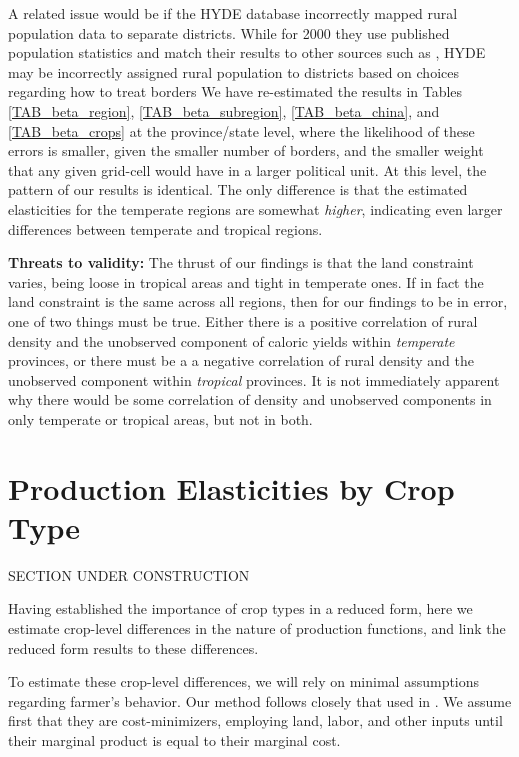 \documentclass[11pt]{article}
\begin{document}
A related issue would be if the HYDE database incorrectly mapped rural population data to separate districts. While for 2000 they use published population statistics and match their results to other sources such as \citet{GRUMP}, HYDE may be incorrectly assigned rural population to districts based on choices regarding how to treat borders We have re-estimated the results in Tables \ref{TAB_beta_region}, \ref{TAB_beta_subregion}, \ref{TAB_beta_china}, and \ref{TAB_beta_crops} at the province/state level, where the likelihood of these errors is smaller, given the smaller number of borders, and the smaller weight that any given grid-cell would have in a larger political unit. At this level, the pattern of our results is identical. The only difference is that the estimated elasticities for the temperate regions are somewhat \textit{higher}, indicating even larger differences between temperate and tropical regions.

\vspace{.5cm}\noindent\textbf{Threats to validity:} The thrust of our findings is that the land constraint varies, being loose in tropical areas and tight in temperate ones. If in fact the land constraint is the same across all regions, then for our findings to be in error, one of two things must be true. Either there is a positive correlation of rural density and the unobserved component of caloric yields within \textit{temperate} provinces, or there must be a a negative correlation of rural density and the unobserved component within \textit{tropical} provinces. It is not immediately apparent why there would be some correlation of density and unobserved components in only temperate or tropical areas, but not in both.

\section{Production Elasticities by Crop Type}
SECTION UNDER CONSTRUCTION

Having established the importance of crop types in a reduced form, here we estimate crop-level differences in the nature of production functions, and link the reduced form results to these differences. 

To estimate these crop-level differences, we will rely on minimal assumptions regarding farmer's behavior. Our method follows closely that used in \citet{fs2015}. We assume first that they are cost-minimizers, employing land, labor, and other inputs until their marginal product is equal to their marginal cost. 
\end{document}
